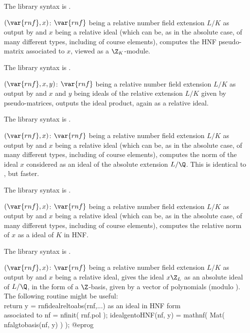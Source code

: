 The library syntax is .

$(\var{rnf},x)$: \label{se:rnfidealhnf}$\var{rnf}$ being a relative number
field extension $L/K$ as output by  and $x$ being a relative
ideal (which can be, as in the absolute case, of many different types,
including of course elements), computes the HNF pseudo-matrix associated to
$x$, viewed as a $\Z_K$-module.

The library syntax is .

$(\var{rnf},x,y)$: \label{se:rnfidealmul}$\var{rnf}$ being a relative number
field extension $L/K$ as output by  and $x$ and $y$ being ideals
of the relative extension $L/K$ given by pseudo-matrices, outputs the ideal
product, again as a relative ideal.

The library syntax is .

$(\var{rnf},x)$: \label{se:rnfidealnormabs}$\var{rnf}$ being a relative
number field extension $L/K$ as output by  and $x$ being a
relative ideal (which can be, as in the absolute case, of many different
types, including of course elements), computes the norm of the ideal $x$
considered as an ideal of the absolute extension $L/\Q$. This is identical to
, but faster.

The library syntax is .

$(\var{rnf},x)$: \label{se:rnfidealnormrel}$\var{rnf}$ being a relative
number field extension $L/K$ as output by  and $x$ being a
relative ideal (which can be, as in the absolute case, of many different
types, including of course elements), computes the relative norm of $x$ as a
ideal of $K$ in HNF.

The library syntax is .

$(\var{rnf},x)$: \label{se:rnfidealreltoabs}$\var{rnf}$ being a relative
number field extension $L/K$ as output by  and $x$ being a
relative ideal, gives the ideal $x\Z_L$ as an absolute ideal of $L/\Q$, in
the form of a $\Z$-basis, given by a vector of polynomials (modulo
).
The following routine might be useful:
\bprog
\\ return y = rnfidealreltoabs(rnf,...) as an ideal in HNF form
\\ associated to nf = nfinit( rnf.pol );
idealgentoHNF(nf, y) = mathnf( Mat( nfalgtobasis(nf, y) ) );
@eprog

